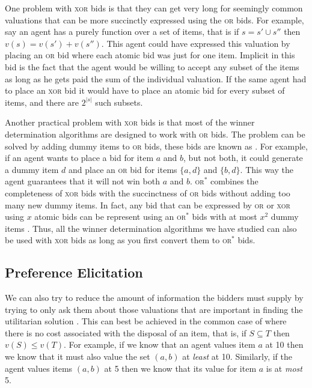 One problem with \textsc{xor} bids is that they can get very long for
seemingly common valuations that can be more succinctly expressed using
the \textsc{or} bids. For example, say an agent has a purely
 function over a set of items, that is if $s =
s' \cup s''$ then $v(s) = v(s') + v(s'')$. This agent could have
expressed this valuation by placing an \textsc{or} bid where each
atomic bid was just for one item. Implicit in this bid is the fact
that the agent would be willing to accept any subset of the items as
long as he gets paid the sum of the individual valuation. If the same
agent had to place an \textsc{xor} bid it would have to place an
atomic bid for every subset of items, and there are $2^{|s|}$ such
subsets.

Another practical problem with \textsc{xor} bids is that most of the
winner determination algorithms are designed to work with \textsc{or}
bids.  The problem can be solved by adding dummy items to \textsc{or}
bids, these bids are known as .
For example, if an agent wants to place a bid for item $a$ and $b$,
but not both, it could generate a dummy item $d$ and place an
\textsc{or} bid for items $\{a,d\}$ and $\{b,d\}$. This way the agent
guarantees that it will not win both $a$ and $b$. \textsc{or}$^*$
combines the completeness of \textsc{xor} bids with the succinctness
of \textsc{or} bids without adding too many new dummy items. In fact,
any bid that can be expressed by \textsc{or} or \textsc{xor} using $x$
atomic bids can be represent using an \textsc{or}$^*$ bids with at
most $x^2$ dummy items \cite{nisan00a}. Thus, all the winner
determination algorithms we have studied can also be used with
\textsc{xor} bids as long as you first convert them to \textsc{or}$^*$
bids.

\subsection{Preference Elicitation}
\label{sec:pref-elic}

We can also try to reduce the amount of information the bidders must
supply by trying to only ask them about those valuations that are
important in finding the utilitarian solution \cite{hudson04a}. This
can best be achieved in the common case of  where
there is no cost associated with the disposal of an item, that is, if
$S \subseteq T$ then $v(S) \leq v(T)$. For example, if we know that an
agent values item $a$ at 10 then we know that it must also value the
set $(a,b)$ at \emph{least} at 10. Similarly, if the agent values
items $(a,b)$ at 5 then we know that its value for item $a$ is at
\emph{most} 5.

